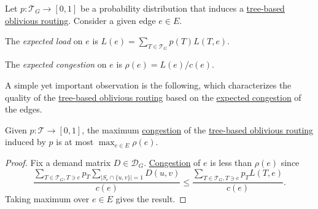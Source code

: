 \begin{definition*}
	Let \(p \colon \mathcal{T} _G \to [0, 1]\) be a probability distribution that induces a \hyperref[not:tree-based-oblivious-routing]{tree-based oblivious routing}. Consider a given edge \(e \in E\).
	\begin{definition}\label{def:expected-load}
		The \emph{expected load} on \(e\) is \(L(e) = \sum_{T \in \mathcal{T} _G} p(T) L(T, e) \).
	\end{definition}

	\begin{definition}\label{def:expected-congestion}
		The \emph{expected congestion} on \(e\) is \(\rho (e) = L(e) / c(e)\).
	\end{definition}
\end{definition*}

A simple yet important observation is the following, which characterizes the quality of the \hyperref[not:tree-based-oblivious-routing]{tree-based oblivious routing} based on the \hyperref[def:expected-congestion]{expected congestion} of the edges.

\begin{lemma}\label{lma:tree-based-oblivious-routing-congestion}
	Given \(p \colon \mathcal{T} \to [0, 1]\), the maximum \hyperref[def:congestion-of-oblivious-routing]{congestion} of the \hyperref[not:tree-based-oblivious-routing]{tree-based oblivious routing} induced by \(p\) is at most \(\max _{e \in E} \rho (e)\).
\end{lemma}
\begin{proof}
	Fix a demand matrix \(D \in \mathcal{D} _G\). \hyperref[def:congestion-of-oblivious-routing]{Congestion} of \(e\) is less than \(\rho (e)\) since
	\[
		\frac{\sum_{T \in \mathcal{T} _G, T \ni e} p_T \sum_{\lvert S_e \cap \{ u, v \} \rvert =1} D(u, v)}{c(e)}
		\leq \frac{\sum_{T \in \mathcal{T} _G, T \ni e} p_T L(T, e)}{c(e)}.
	\]
	Taking maximum over \(e \in E\) gives the result.
\end{proof}

